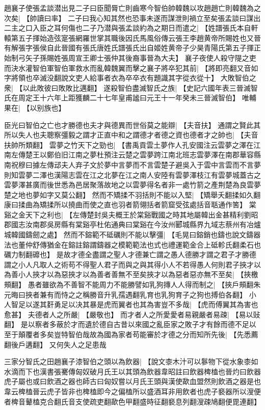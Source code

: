 趙襄子使張孟談潜出見二子曰臣聞脣亡則齒寒今智伯帥韓魏以攻趙趙亡則韓魏為之次矣|{
	【帥讀曰率】}
二子曰我心知其然也恐事未遂而謀泄則禍立至矣張孟談曰謀出二主之口入臣之耳何傷也二子乃潜與張孟談約為之期日而遣之|{
	【姓譜張氏本自軒轅第五子揮始造弦寔張網羅世掌其職後因氏馬風俗傳云張王李趙黄帝所賜姓也又晉有解張字張侯自此晉國有張氏唐姓氏譜張氏出自姬姓黄帝子少昊青陽氏第五子揮正始制弓矢子孫賜姓張周宣王卿士張仲其後裔事晉為大夫】}
襄子夜使人殺守隄之吏而決水灌智伯軍智伯軍救水而亂韓魏翼而擊之襄子將卒犯其前|{
	【將即亮翻又音如字將領也卒滅没翻說文吏人給事者衣為卒卒衣有題識其字從衣從十】}
大敗智伯之衆|{
	【以此敗彼曰敗敗比邁翻】}
遂殺智伯盡滅智氏之族|{
	【史記六國年表三晉滅智氏在周定王十六年上距獲麟二十七年皇甫謐曰元王十一年癸未三晉滅智伯】}
唯輔果在|{
	【以别族也】}
\par
臣光曰智伯之亡也才勝德也夫才與德異而世俗莫之能辯|{
	【夫音扶】}
通謂之賢此其所以失人也夫聰察彊毅之謂才正直中和之謂德才者德之資也德者才之帥也|{
	【夫音扶帥所類翻】}
雲夢之竹天下之勁也|{
	【書禹貢雲土夢作人孔安國注云雲夢之澤在江南左傳楚王以鄭伯旧江南之夢杜預注云楚之雲夢跨江南北班志雲夢澤在南郡華容縣南祝穆曰據左傳䢵夫人弃子文於夢中言夢而不言雲楚子避吳入于雲中言雲而不言夢則知雲夢二澤也漢陽志雲在江之北夢在江之南人安陸有雲夢澤枝江有雲夢城蓋古之雲夢澤甚廣而後世悉為邑居聚落故地之以雲夢得名者非一處竹箭之產荆楚為良雲夢楚之地也夢如字又莫公翻】}
然而不矯揉不羽括則不能以入堅|{
	【矯舉夭翻揉如久翻康曰揉曲為矯揉所以撓曲而使之直也羽者箭翎括者箭窟受弦處括音聒通作筈】}
棠谿之金天下之利也|{
	【左傳楚封吳夫概王於棠谿戰國之時其地屬韓出金甚精利劉昭郡國志汝南郡吳房縣有棠谿亭杜佑通典曰棠谿在今汝州郾城縣界九域志蔡州有冶爐城韓國鑄劒之處】}
然而不鎔範不砥礪則不能以擊彊|{
	【毛晃曰鎔銷也鑄也說文鑄器法也董仲舒傳猶金在鎔註鎔謂鑄器之模範範法也式也禮運範金合上砥軫氏翻柔石也礪力制翻䃺也】}
是故才德全盡謂之聖人才德兼亡謂之愚人德勝才謂之君子才勝德謂之小人凡取人之術苟不得聖人君子而與之與其得小人不若得愚人何則君子挾才以為善小人挾才以為惡挾才以為善者善無不至矣挾才以為惡者惡亦無不至矣|{
	【挾檄頰翻】}
愚者雖欲為不善智不能周力不能勝譬如乳狗摶人人得而制之|{
	【挾戶頰翻朱元晦曰挾者兼有而恃之之稱勝音升乳孺遇翻乳育也乳狗育子之狗也搏伯各翻】}
小人智足以遂其姧勇足以决其暴是虎而翼者也其為害豈不多哉|{
	【虎而傅翼其為害也愈甚】}
夫德者人之所嚴|{
	【嚴敬也】}
而才者人之所愛愛者易親嚴者易疎|{
	【易以䜴翻】}
是以察者多蔽於才而遺於德自古昔以來國之亂臣家之敗子才有餘而德不足以至于顛覆者多矣豈特智伯哉故為國為家者苟能審於才德之分而知所先後|{
	【先悉薦翻後戶遘翻】}
又何失人之足患哉
\par
三家分智氏之田趙襄子漆智伯之頭以為飲器|{
	【說文桼木汁可以鬖物下從水象桼如水滴而下也漢書張騫傳匈奴破月氏王以其頭為飲器韋昭註曰飲器椑榼也晉灼曰飲器虎子屬也或曰飲酒之器也師古曰匈奴嘗以月氏王頭與漢使歃血盟然則飲酒之器是也韋云椑榼晉云虎子皆非也椑榼即今之偏榼所以盛酒耳非用飲者也虎子褻器所以溲便者椑音鼙榼克合翻氏音支使疏吏翻歃色甲翻盛時征翻褻息列翻溲疎鳩翻便毘連翻】}
